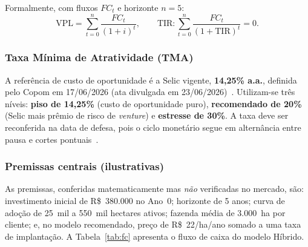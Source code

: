 \documentclass[conference]{IEEEtran}
\newcommand{\rs}{R\$}
\begin{document}
Formalmente, com fluxos $FC_t$ e horizonte $n=5$:
\begin{equation}
\text{VPL}=\sum_{t=0}^{n}\frac{FC_t}{(1+i)^t},\qquad \text{TIR}: \sum_{t=0}^{n}\frac{FC_t}{(1+\text{TIR})^t}=0.
\end{equation}

\subsubsection{Taxa Mínima de Atratividade (TMA)}
A referência de custo de oportunidade é a Selic vigente, \textbf{14,25\% a.a.}, definida pelo Copom em 17/06/2026 (ata divulgada em 23/06/2026)~\cite{bcb,copom_jun2026}. Utilizam-se três níveis: \textbf{piso de 14,25\%} (custo de oportunidade puro), \textbf{recomendado de 20\%} (Selic mais prêmio de risco de \textit{venture}) e \textbf{estresse de 30\%}. A taxa deve ser reconferida na data de defesa, pois o ciclo monetário segue em alternância entre pausa e cortes pontuais~\cite{copom_jun2026}.

\subsubsection{Premissas centrais (ilustrativas)}
As premissas, conferidas matematicamente mas \emph{não} verificadas no mercado, são: investimento inicial de \rs~380.000 no Ano~0; horizonte de 5 anos; curva de adoção de 25~mil a 550~mil hectares ativos; fazenda média de 3.000~ha por cliente; e, no modelo recomendado, preço de \rs~22/ha/ano somado a uma taxa de implantação. A Tabela~\ref{tab:fc} apresenta o fluxo de caixa do modelo Híbrido.
\end{document}
